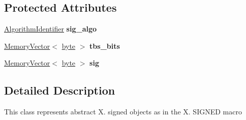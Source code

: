 \subsection*{Protected Attributes}
\begin{DoxyCompactItemize}
\item 
\hypertarget{classBotan_1_1X509__Object_a7cbfaa8d796e35e80abb9fc2dfa4df4e}{\hyperlink{classBotan_1_1AlgorithmIdentifier}{Algorithm\-Identifier} {\bfseries sig\-\_\-algo}}\label{classBotan_1_1X509__Object_a7cbfaa8d796e35e80abb9fc2dfa4df4e}

\item 
\hypertarget{classBotan_1_1X509__Object_ad3c725a005949b231f11334c40f20bce}{\hyperlink{classBotan_1_1MemoryVector}{Memory\-Vector}$<$ \hyperlink{namespaceBotan_a7d793989d801281df48c6b19616b8b84}{byte} $>$ {\bfseries tbs\-\_\-bits}}\label{classBotan_1_1X509__Object_ad3c725a005949b231f11334c40f20bce}

\item 
\hypertarget{classBotan_1_1X509__Object_a1bd5e3f7c5ef56d7d1b9be2e9e9a6db7}{\hyperlink{classBotan_1_1MemoryVector}{Memory\-Vector}$<$ \hyperlink{namespaceBotan_a7d793989d801281df48c6b19616b8b84}{byte} $>$ {\bfseries sig}}\label{classBotan_1_1X509__Object_a1bd5e3f7c5ef56d7d1b9be2e9e9a6db7}

\end{DoxyCompactItemize}


\subsection{Detailed Description}
This class represents abstract X. signed objects as in the X. S\-I\-G\-N\-E\-D macro 


